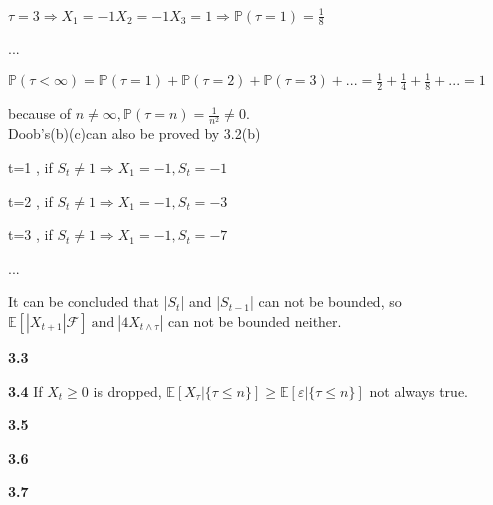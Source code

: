 \begin{enumerate}[(a)]
    $\tau=3 \Rightarrow X_1=-1 X_2=-1 X_3=1 \Rightarrow \mathbb{P}(\tau=1)=\frac{1}{8}$
     	
    ...
    
    $\mathbb{P}(\tau<\infty)=\mathbb{P}(\tau=1)+\mathbb{P}(\tau=2)+\mathbb{P}(\tau=3)+...
    =\frac{1}{2}+\frac{1}{4}+\frac{1}{8}+...=1$
    
    because of $n\not=\infty,\mathbb{P}(\tau=n)=\frac{1}{n^2}\not=0$.\\
    Doob's(b)(c)can also be proved by 3.2(b)
    
    t=1 , if $S_t\not=1 \Rightarrow X_1=-1 , S_t=-1$
    
    t=2 , if $S_t\not=1 \Rightarrow X_1=-1 , S_t=-3$
    
    t=3 , if $S_t\not=1 \Rightarrow X_1=-1 , S_t=-7$
    
    ...
    
    It can be concluded that |$S_t$| and |$S_{t-1}$| can not be bounded, so $\mathbb{E}[|X_{t+1}|\mathcal{F}]\ \text{and}\ |4X_{t\wedge\tau}|$ can not be bounded neither.
    
    \end{enumerate}

\noindent\textbf{3.3}




\noindent\textbf{3.4} If $X_t\ge0$ is dropped, $\mathbb{E}[X_\tau|\{\tau\le n\}] \ge \mathbb{E}[\varepsilon|\{\tau\le n\}]$ not always true.




\noindent\textbf{3.5}




\noindent\textbf{3.6}


\noindent\textbf{3.7}